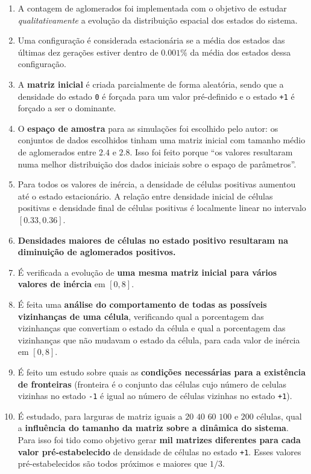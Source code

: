 \documentclass[12pt,a4paper,final]{article}
\begin{document}
\begin{enumerate}
    \item A contagem de aglomerados foi implementada com o objetivo de estudar \textit{qualitativamente} a evolução da distribuição espacial dos estados do sistema.
    \item Uma configuração é considerada estacionária se a média dos estados das últimas dez gerações estiver dentro de $0.001\%$ da média dos estados dessa configuração.
    \item A \textbf{matriz inicial} é criada parcialmente de forma aleatória, sendo que a densidade do estado \texttt{0} é forçada para um valor pré-definido e o estado \texttt{+1} é forçado a ser o dominante.
    \item O \textbf{espaço de amostra} para as simulações foi escolhido pelo autor: os conjuntos de dados escolhidos tinham uma matriz inicial com tamanho médio de aglomerados entre $2.4$ e $2.8$. Isso foi feito porque ``os valores resultaram numa melhor distribuição dos dados iniciais sobre o espaço de parâmetros''.
    \item Para todos os valores de inércia, a densidade de células positivas aumentou até o estado estacionário. A relação entre densidade inicial de células positivas e densidade final de células positivas é localmente linear no intervalo $[0.33, 0.36]$.
    \item \textbf{Densidades maiores de células no estado positivo resultaram na diminuição de aglomerados positivos.}
    \item É verificada a evolução de \textbf{uma mesma matriz inicial para vários valores de inércia} em $[0,8]$.
    \item É feita uma \textbf{análise do comportamento de todas as possíveis vizinhanças de uma célula}, verificando qual a porcentagem das vizinhanças que convertiam o estado da célula e qual a porcentagem das vizinhanças que não mudavam o estado da célula, para cada valor de inércia em $[0,8]$.
    \item É feito um estudo sobre quais as \textbf{condições necessárias para a existência de fronteiras} (fronteira é o conjunto das células cujo número de celulas vizinhas no estado \texttt{-1} é igual ao número de células vizinhas no estado \texttt{+1}).
    \item É estudado, para larguras de matriz iguais a $20$ $40$ $60$ $100$ e $200$ células, qual a \textbf{influência do tamanho da matriz sobre a dinâmica do sistema}. Para isso foi tido como objetivo gerar \textbf{mil matrizes diferentes para cada valor pré-estabelecido} de densidade de células no estado \texttt{+1}. Esses valores pré-estabelecidos são todos próximos e maiores que $1/3$.

\end{enumerate}
\end{document}
